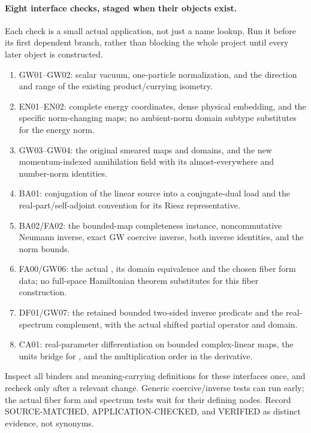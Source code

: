 \documentclass[11pt,a4paper]{article}
\theoremstyle{remark}\newtheorem{remark}[theorem]{Remark}
\newcommand{\contract}[1]{\textsf{#1}}
\begin{document}
\paragraph{Eight interface checks, staged when their objects exist.}
Each check is a small actual application, not just a name lookup. Run it before its first dependent branch, rather than blocking the whole project until every later object is constructed.
\begin{enumerate}
\item GW01--GW02: scalar vacuum, one-particle normalization, and the direction and range of the existing product/currying isometry.
\item EN01--EN02: complete energy coordinates, dense physical embedding, and the specific norm-changing maps; no ambient-norm domain subtype substitutes for the energy norm.
\item GW03--GW04: the original smeared maps and domains, and the new momentum-indexed annihilation field with its almost-everywhere and number-norm identities.
\item BA01: conjugation of the linear source into a conjugate-dual load and the real-part/self-adjoint convention for its Riesz representative.
\item BA02/FA02: the bounded-map completeness instance, noncommutative Neumann inverse, exact GW coercive inverse, both inverse identities, and the norm bounds.
\item FA00/GW06: the actual , its domain equivalence and the chosen fiber form data; no full-space Hamiltonian theorem substitutes for this fiber construction.
\item DF01/GW07: the retained bounded two-sided inverse predicate and the real-spectrum complement, with the actual shifted partial operator and domain.
\item CA01: real-parameter differentiation on bounded complex-linear maps, the units bridge for , and the multiplication order in the derivative.
\end{enumerate}
Inspect all binders and meaning-carrying definitions for these interfaces once, and recheck only after a relevant change. Generic coercive/inverse tests can run early; the actual fiber form and spectrum tests wait for their defining nodes. Record \contract{SOURCE-MATCHED}, \contract{APPLICATION-CHECKED}, and \contract{VERIFIED} as distinct evidence, not synonyms.
\end{document}
